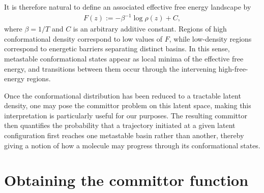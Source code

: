 \documentclass[11pt]{amsart}
\begin{document}
It is therefore natural to define an associated effective free energy landscape by
\begin{align}
    F(z) := -\beta^{-1}\log \hat{\rho}(z) + C,
\end{align}
where $\beta=1/T$ and $C$ is an arbitrary additive constant. Regions of high conformational density correspond to low values of $F$, while low-density regions correspond to energetic barriers separating distinct basins. In this sense, metastable conformational states appear as local minima of the effective free energy, and transitions between them occur through the intervening high-free-energy regions.

Once the conformational distribution has been reduced to a tractable latent density, one may pose the committor problem on this latent space, making this interpretation is particularly useful for our purposes. The resulting committor then quantifies the probability that a trajectory initiated at a given latent configuration first reaches one metastable basin rather than another, thereby giving a notion of how a molecule may progress through its conformational states.

\section{Obtaining the committor function}
\end{document}
